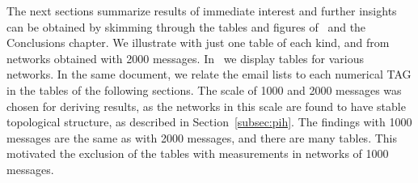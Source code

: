 																																							The next sections summarize results of immediate interest
																																							and further insights can be obtained by skimming through
																																							the tables and figures of~\cite{stab,textTables} and the Conclusions chapter.
																																							We illustrate with just one table of each kind,
																																							and from networks obtained with 2000 messages.
																																							In~\cite{textTables} we display tables for various networks.
																																							In the same document, we relate the email lists to each numerical
																																							TAG in the tables of the following sections.
																																							The scale of 1000 and 2000 messages was chosen for deriving results,
																																							as the networks in this scale are found to have stable topological structure,
																																							as described in Section~\ref{subsec:pih}.
																																							The findings with 1000 messages are the same as with 2000 messages,
																																							and there are many tables.
																																							This motivated the exclusion of the tables with measurements in
																																							networks of 1000 messages.

